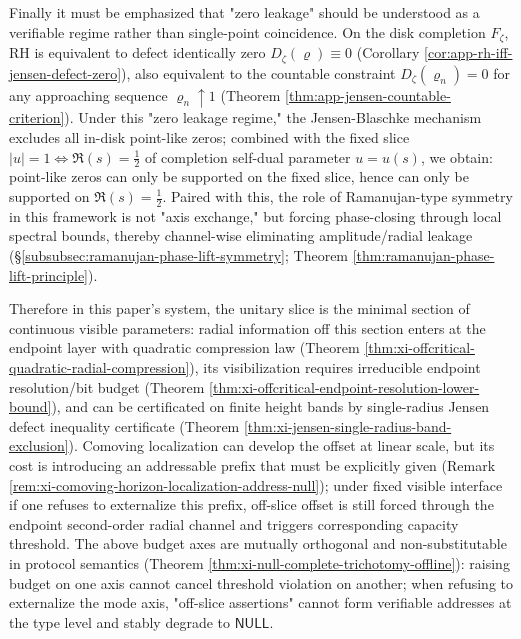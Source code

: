Finally it must be emphasized that "zero leakage" should be understood as a verifiable regime rather than single-point coincidence.
On the disk completion \(F_\zeta\), RH is equivalent to defect identically zero \(D_{\zeta}(\varrho)\equiv 0\) (Corollary \ref{cor:app-rh-iff-jensen-defect-zero}), also equivalent to the countable constraint \(D_{\zeta}(\varrho_n)=0\) for any approaching sequence \(\varrho_n\uparrow 1\) (Theorem \ref{thm:app-jensen-countable-criterion}).
Under this "zero leakage regime," the Jensen-Blaschke mechanism excludes all in-disk point-like zeros; combined with the fixed slice \(|u|=1\iff \Re(s)=\tfrac12\) of completion self-dual parameter \(u=u(s)\), we obtain: point-like zeros can only be supported on the fixed slice, hence can only be supported on \(\Re(s)=\tfrac12\).
Paired with this, the role of Ramanujan-type symmetry in this framework is not "axis exchange," but forcing phase-closing through local spectral bounds, thereby channel-wise eliminating amplitude/radial leakage (\S\ref{subsubsec:ramanujan-phase-lift-symmetry}; Theorem \ref{thm:ramanujan-phase-lift-principle}).
\par
Therefore in this paper's system, the unitary slice is the minimal section of continuous visible parameters: radial information off this section enters at the endpoint layer with quadratic compression law (Theorem \ref{thm:xi-offcritical-quadratic-radial-compression}), its visibilization requires irreducible endpoint resolution/bit budget (Theorem \ref{thm:xi-offcritical-endpoint-resolution-lower-bound}), and can be certificated on finite height bands by single-radius Jensen defect inequality certificate (Theorem \ref{thm:xi-jensen-single-radius-band-exclusion}).
Comoving localization can develop the offset at linear scale, but its cost is introducing an addressable prefix that must be explicitly given (Remark \ref{rem:xi-comoving-horizon-localization-address-null}); under fixed visible interface if one refuses to externalize this prefix, off-slice offset is still forced through the endpoint second-order radial channel and triggers corresponding capacity threshold.
The above budget axes are mutually orthogonal and non-substitutable in protocol semantics (Theorem \ref{thm:xi-null-complete-trichotomy-offline}): raising budget on one axis cannot cancel threshold violation on another; when refusing to externalize the mode axis, "off-slice assertions" cannot form verifiable addresses at the type level and stably degrade to \(\mathsf{NULL}\).

\endinput
